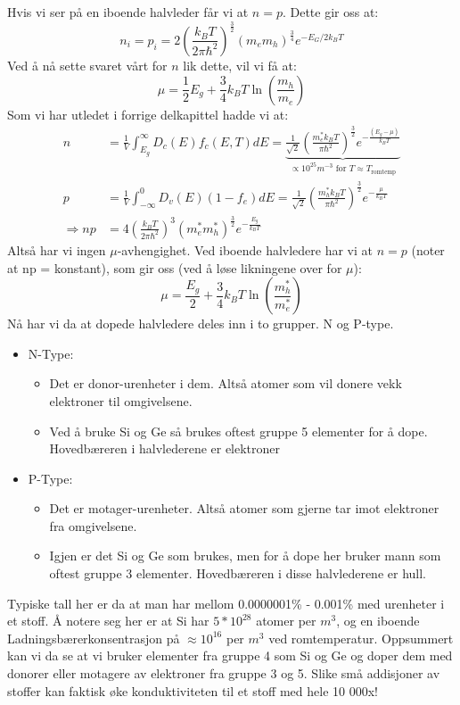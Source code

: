 \documentclass{article}
\begin{document}
Hvis vi ser på en iboende halvleder får vi at $n = p$. Dette gir oss at:
\begin{equation}
    n_i = p_i = 2 \left(\frac{k_BT}{2\pi \hbar^2}\right)^{\frac{3}{2}} (m_e m_h)^{\frac{3}{4}}e^{-E_G / 2k_BT}
\end{equation}
Ved å nå sette svaret vårt for $n$ lik dette, vil vi få at:
\begin{equation}
    \mu = \frac{1}{2} E_g + \frac{3}{4} k_BT \ln(\frac{m_h}{m_e})
\end{equation}
Som vi har utledet i forrige delkapittel hadde vi at:
\begin{align}
  n &= \frac{1}{V} \int_{E_g}^{\infty} D_c(E) f_c(E, T)dE = \underbrace{\frac{1}{\sqrt{2}} \left( \frac{m_e^{*} k_B T}{\pi \hbar^2}\right)^{\frac{3}{2}} e^{-\frac{(E_g - \mu)}{k_B T}} }_{\propto 10^{25} m^{-3}\text{ for } T \approx T_{\text{romtemp}}} \\
  p &=\frac{1}{V} \int_{-\infty}^0 D_v(E) (1-f_e) dE = \frac{1}{\sqrt{2}} \left( \frac{m_h^{*} k_B T}{\pi \hbar^2}\right)^{\frac{3}{2}} e^{-\frac{\mu}{k_B T}}\\
  \Rightarrow np &= 4 \left(\frac{k_B T}{2 \pi \hbar^2}\right)^3 (m_e^{*} m_h^{*})^{\frac{3}{2}} e^{-\frac{E_g}{k_B T}}
\end{align}
Altså har vi ingen $\mu$-avhengighet. Ved iboende halvledere har vi at $n=p$ (noter at np = konstant), som gir oss (ved å løse likningene over for $\mu$):
\begin{equation}
  \mu = \frac{E_g}{2} + \frac{3}{4} k_B T \ln{\left(\frac{m_h^{*}}{m_e^{*}}  \right)}
\end{equation}
Nå har vi da at dopede halvledere deles inn i to grupper. N og P-type.
\begin{itemize}
  \item N-Type:
  \begin{itemize}
    \item Det er donor-urenheter i dem. Altså atomer som vil donere vekk elektroner til omgivelsene.
    \item Ved å bruke Si og Ge så brukes oftest gruppe 5 elementer for å dope. Hovedbæreren i halvlederene er elektroner
  \end{itemize}
  \item P-Type: 
  \begin{itemize}
    \item Det er motager-urenheter. Altså atomer som gjerne tar imot elektroner fra omgivelsene.
    \item Igjen er det Si og Ge som brukes, men for å dope her bruker mann som oftest gruppe 3 elementer. Hovedbæreren i disse halvlederene er hull.
  \end{itemize}
\end{itemize}
Typiske tall her er da at man har mellom  0.0000001\% - 0.001\% med urenheter i et stoff. Å notere seg her er at Si har $5 * 10^{28}$ atomer per $m^3$, og en iboende Ladningsbærerkonsentrasjon på $\approx 10^{16}$ per $m^3$ ved romtemperatur. Oppsummert kan vi da se at vi bruker elementer fra gruppe 4 som Si og Ge og doper dem med donorer eller motagere av elektroner fra gruppe 3 og 5. Slike små addisjoner av stoffer kan faktisk øke konduktiviteten til et stoff med hele 10 000x!
\end{document}
